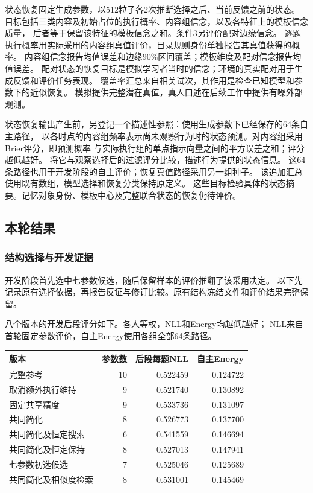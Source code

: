 \documentclass[11pt,a4paper]{article}
\numberwithin{equation}{section}
\begin{document}
状态恢复固定生成参数，以512粒子各2次推断选择之后、当前反馈之前的状态。
目标包括三类内容及初始占位的执行概率、内容组信念，以及各特征上的模板信念质量，
后者等于保留该特征的模板信念之和。条件3另评价配对边缘信念。
逐题执行概率用实际采用的内容组真值评价，目录规则身份单独报告其真值获得的概率。
内容组信念报告均值误差和边缘90\%区间覆盖；模板维度及配对信念报告均值误差。
配对状态的恢复目标是模拟学习者当时的信念；环境的真实配对用于生成反馈和评价任务表现。
覆盖率汇总来自相关试次，其作用是检查已知模型和参数下的近似恢复。
模拟提供完整潜在真值，真人口述在后续工作中提供有噪外部观测。

状态恢复输出产生前，另登记一个描述性参照：使用生成参数下已经保存的64条自主路径，
以各时点的内容组频率表示尚未观察行为时的状态预测。对内容组采用Brier评分，即预测概率
与实际执行组的单点指示向量之间的平方误差之和；评分越低越好。
将它与观察选择后的过滤评分比较，描述行为提供的状态信息。
这64条路径也用于开发阶段的自主评价；恢复真值路径采用另一组种子。
该追加汇总使用既有数组，模型选择和恢复分类保持原定义。
这些目标检验具体的状态摘要。记忆对象身份、模板中心及完整联合状态的恢复仍待评价。

\subsection{本轮结果}
\subsubsection{结构选择与开发证据}
开发阶段首先选中七参数候选，随后保留样本的评价推翻了该采用决定。
以下先记录原有选择依据，再报告反证与修订比较。原有结构冻结文件和评价结果完整保留。

八个版本的开发后段评分如下。各人等权，NLL和Energy均越低越好；
NLL来自首轮固定参数评价，自主Energy使用各组全部64条路径。
\begin{center}
\begin{tabularx}{\textwidth}{Y r r r}
\toprule
版本 & 参数数 & 后段每题NLL & 自主Energy\\
\midrule
完整参考 & 10 & 0.522459 & 0.124722 \\
取消额外执行维持 & 9 & 0.521740 & 0.130892 \\
固定共享精度 & 9 & 0.533736 & 0.131097 \\
共同简化 & 8 & 0.526773 & 0.137700 \\
共同简化及恒定搜索 & 6 & 0.541559 & 0.146694 \\
共同简化及恒定保持 & 8 & 0.527013 & 0.147941 \\
七参数初选候选 & 7 & 0.525046 & 0.125689 \\
共同简化及相似度检索 & 8 & 0.531001 & 0.145469 \\
\bottomrule
\end{tabularx}
\end{center}
\end{document}
